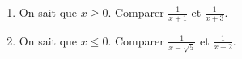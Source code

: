 
\begin{exercice}\label{exosmath-0144}

    \begin{enumerate}
        \item
            On sait que \( x\geq 0\). Comparer \( \frac{1}{ x+1 }\) et \( \frac{1}{ x+3 }\).
        \item
            On sait que \( x\leq 0\). Comparer \( \frac{1}{ x-\sqrt{5} }\) et \( \frac{1}{ x-2 }\).
    \end{enumerate}

\end{exercice}
